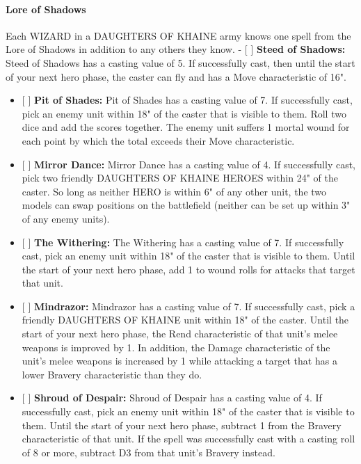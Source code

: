 \hypertarget{lore-of-shadows}{%
\paragraph{Lore of Shadows}\label{lore-of-shadows}}

Each WIZARD in a DAUGHTERS OF KHAINE army knows one spell from the Lore
of Shadows in addition to any others they know. - {[} {]} \textbf{Steed
of Shadows:} Steed of Shadows has a casting value of 5. If successfully
cast, then until the start of your next hero phase, the caster can fly
and has a Move characteristic of 16".

\begin{itemize}
\item
  {[} {]} \textbf{Pit of Shades:} Pit of Shades has a casting value of
  7. If successfully cast, pick an enemy unit within 18" of the caster
  that is visible to them. Roll two dice and add the scores together.
  The enemy unit suffers 1 mortal wound for each point by which the
  total exceeds their Move characteristic.
\item
  {[} {]} \textbf{Mirror Dance:} Mirror Dance has a casting value of 4.
  If successfully cast, pick two friendly DAUGHTERS OF KHAINE HEROES
  within 24" of the caster. So long as neither HERO is within 6" of any
  other unit, the two models can swap positions on the battlefield
  (neither can be set up within 3" of any enemy units).
\item
  {[} {]} \textbf{The Withering:} The Withering has a casting value of
  7. If successfully cast, pick an enemy unit within 18" of the caster
  that is visible to them. Until the start of your next hero phase, add
  1 to wound rolls for attacks that target that unit.
\item
  {[} {]} \textbf{Mindrazor:} Mindrazor has a casting value of 7. If
  successfully cast, pick a friendly DAUGHTERS OF KHAINE unit within 18"
  of the caster. Until the start of your next hero phase, the Rend
  characteristic of that unit's melee weapons is improved by 1. In
  addition, the Damage characteristic of the unit's melee weapons is
  increased by 1 while attacking a target that has a lower Bravery
  characteristic than they do.
\item
  {[} {]} \textbf{Shroud of Despair:} Shroud of Despair has a casting
  value of 4. If successfully cast, pick an enemy unit within 18" of the
  caster that is visible to them. Until the start of your next hero
  phase, subtract 1 from the Bravery characteristic of that unit. If the
  spell was successfully cast with a casting roll of 8 or more, subtract
  D3 from that unit's Bravery instead.
\end{itemize}

